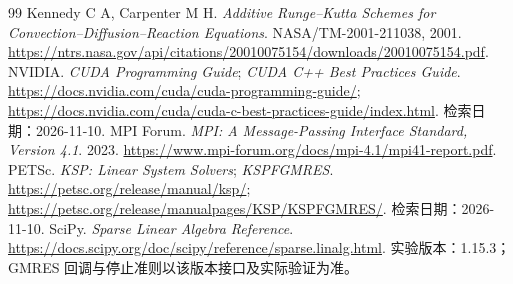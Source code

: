 \begin{thebibliography}{99}
 Kennedy C A, Carpenter M H. \emph{Additive Runge--Kutta Schemes for Convection--Diffusion--Reaction Equations}. NASA/TM-2001-211038, 2001. \url{https://ntrs.nasa.gov/api/citations/20010075154/downloads/20010075154.pdf}.
 NVIDIA. \emph{CUDA Programming Guide}; \emph{CUDA C++ Best Practices Guide}. \url{https://docs.nvidia.com/cuda/cuda-programming-guide/}; \url{https://docs.nvidia.com/cuda/cuda-c-best-practices-guide/index.html}. 检索日期：2026-11-10.
 MPI Forum. \emph{MPI: A Message-Passing Interface Standard, Version 4.1}. 2023. \url{https://www.mpi-forum.org/docs/mpi-4.1/mpi41-report.pdf}.
 PETSc. \emph{KSP: Linear System Solvers}; \emph{KSPFGMRES}. \url{https://petsc.org/release/manual/ksp/}; \url{https://petsc.org/release/manualpages/KSP/KSPFGMRES/}. 检索日期：2026-11-10.
 SciPy. \emph{Sparse Linear Algebra Reference}. \url{https://docs.scipy.org/doc/scipy/reference/sparse.linalg.html}. 实验版本：1.15.3；GMRES 回调与停止准则以该版本接口及实际验证为准。
\end{thebibliography}
